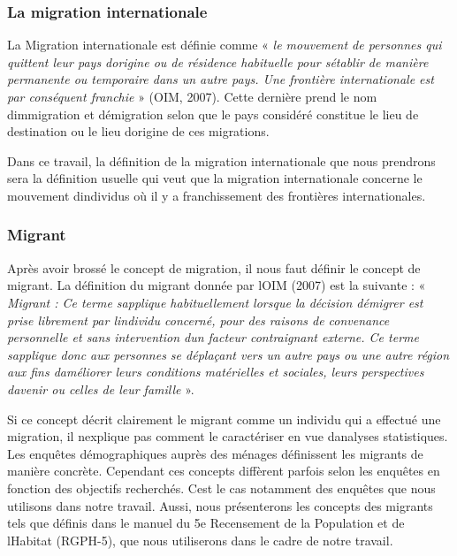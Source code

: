 \documentclass[
  letterpaper,
  DIV=11,
  numbers=noendperiod]{scrartcl}
\begin{document}
\hypertarget{la-migration-internationale}{%
\subsubsection{La migration
internationale}\label{la-migration-internationale}}

La Migration internationale est définie comme « \emph{le mouvement de
personnes qui quittent leur pays d\textquotesingle origine ou de
résidence habituelle pour s\textquotesingle établir de manière
permanente ou temporaire dans un autre pays. Une frontière
internationale est par conséquent franchie} » (OIM, 2007). Cette
dernière prend le nom d\textquotesingle immigration et
d\textquotesingle émigration selon que le pays considéré constitue le
lieu de destination ou le lieu d\textquotesingle origine de ces
migrations.

Dans ce travail, la définition de la migration internationale que nous
prendrons sera la définition usuelle qui veut que la migration
internationale concerne le mouvement d\textquotesingle individus où il y
a franchissement des frontières internationales.

\hypertarget{migrant}{%
\subsubsection{Migrant}\label{migrant}}

Après avoir brossé le concept de migration, il nous faut définir le
concept de migrant. La définition du migrant donnée par
l\textquotesingle OIM (2007) est la suivante : « \emph{Migrant : Ce
terme s\textquotesingle applique habituellement lorsque la décision
d\textquotesingle émigrer est prise librement par
l\textquotesingle individu concerné, pour des raisons de convenance
personnelle et sans intervention d\textquotesingle un facteur
contraignant externe. Ce terme s\textquotesingle applique donc aux
personnes se déplaçant vers un autre pays ou une autre région aux fins
d\textquotesingle améliorer leurs conditions matérielles et sociales,
leurs perspectives d\textquotesingle avenir ou celles de leur famille}
».

Si ce concept décrit clairement le migrant comme un individu qui a
effectué une migration, il n\textquotesingle explique pas comment le
caractériser en vue d\textquotesingle analyses statistiques. Les
enquêtes démographiques auprès des ménages définissent les migrants de
manière concrète. Cependant ces concepts diffèrent parfois selon les
enquêtes en fonction des objectifs recherchés. C\textquotesingle est le
cas notamment des enquêtes que nous utilisons dans notre travail. Aussi,
nous présenterons les concepts des migrants tels que définis dans le
manuel du 5e Recensement de la Population et de
l\textquotesingle Habitat (RGPH-5), que nous utiliserons dans le cadre
de notre travail.
\end{document}
